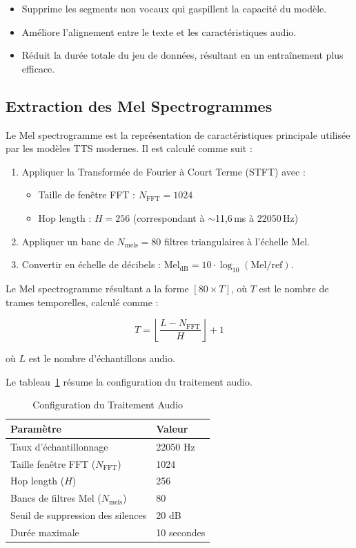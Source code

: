 \documentclass[12pt,a4paper]{article}
\begin{document}
\begin{itemize}
    \item Supprime les segments non vocaux qui gaspillent la capacité du modèle.
    \item Améliore l'alignement entre le texte et les caractéristiques audio.
    \item Réduit la durée totale du jeu de données, résultant en un entraînement plus efficace.
\end{itemize}

\subsection{Extraction des Mel Spectrogrammes}

Le Mel spectrogramme est la représentation de caractéristiques principale utilisée par les modèles TTS modernes. Il est calculé comme suit :

\begin{enumerate}
    \item Appliquer la Transformée de Fourier à Court Terme (STFT) avec :
    \begin{itemize}
        \item Taille de fenêtre FFT : $N_{\text{FFT}} = 1024$
        \item Hop length : $H = 256$ (correspondant à $\sim$11,6\,ms à 22050\,Hz)
    \end{itemize}
    \item Appliquer un banc de $N_{\text{mels}} = 80$ filtres triangulaires à l'échelle Mel.
    \item Convertir en échelle de décibels : $\text{Mel}_{\text{dB}} = 10 \cdot \log_{10}(\text{Mel} / \text{ref})$.
\end{enumerate}

Le Mel spectrogramme résultant a la forme $[80 \times T]$, où $T$ est le nombre de trames temporelles, calculé comme :

\begin{equation}
T = \left\lfloor \frac{L - N_{\text{FFT}}}{H} \right\rfloor + 1
\end{equation}

où $L$ est le nombre d'échantillons audio.

Le tableau~\ref{tab:audio_config} résume la configuration du traitement audio.

\begin{table}[H]
\centering
\caption{Configuration du Traitement Audio}
\label{tab:audio_config}
\begin{tabular}{ll}
\toprule
\textbf{Paramètre} & \textbf{Valeur} \\
\midrule
Taux d'échantillonnage & 22050 Hz \\
Taille fenêtre FFT ($N_{\text{FFT}}$) & 1024 \\
Hop length ($H$) & 256 \\
Bancs de filtres Mel ($N_{\text{mels}}$) & 80 \\
Seuil de suppression des silences & 20 dB \\
Durée maximale & 10 secondes \\
\bottomrule
\end{tabular}
\end{table}
\end{document}
